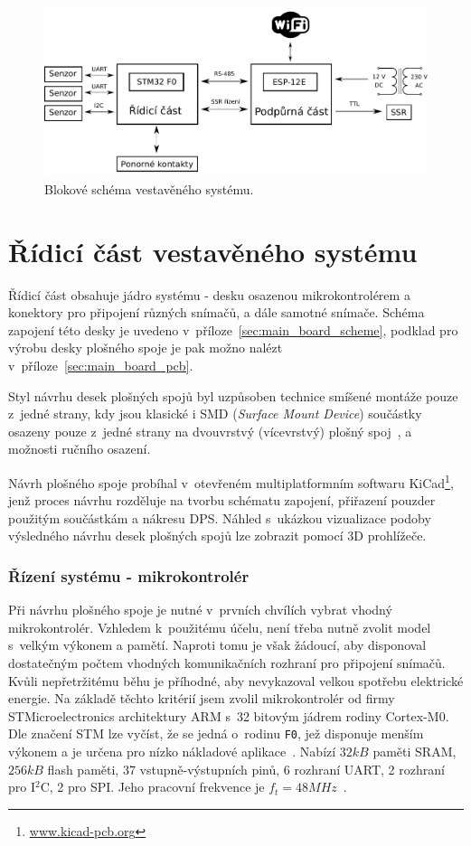         \begin{figure}[h]
            \centering
            \includegraphics[width=\linewidth]{obrazky-figures/scheme.pdf}
            \caption{Blokové schéma vestavěného systému.}
            \label{img:block_scheme}
        \end{figure}

    \section{Řídicí část vestavěného systému}
        Řídicí část obsahuje jádro systému - desku osazenou mikrokontrolérem a konektory pro připojení různých snímačů, a dále samotné snímače. Schéma zapojení této desky je uvedeno v~příloze~\ref{sec:main_board_scheme}, podklad pro výrobu desky plošného spoje je pak možno nalézt v~příloze~\ref{sec:main_board_pcb}. 

        Styl návrhu desek plošných spojů byl uzpůsoben technice smíšené montáže pouze z~jedné strany, kdy jsou klasické i SMD (\textit{Surface Mount Device}) součástky osazeny pouze z~jedné strany na dvouvrstvý (vícevrstvý) plošný spoj~\cite{book:dps}, a možnosti ručního osazení.

        Návrh plošného spoje probíhal v~otevřeném multiplatformním softwaru KiCad\footnote{\url{www.kicad-pcb.org}}, jenž proces návrhu rozděluje na tvorbu schématu zapojení, přiřazení pouzder použitým součástkám a nákresu DPS. Náhled s~ukázkou vizualizace podoby výsledného návrhu desek plošných spojů lze zobrazit pomocí 3D prohlížeče.

        \subsubsection{Řízení systému - mikrokontrolér}
            Při návrhu plošného spoje je nutné v~prvních chvílích vybrat vhodný mikrokontrolér. Vzhledem k~použitému účelu, není třeba nutně zvolit model s~velkým výkonem a pamětí. Naproti tomu je však žádoucí, aby disponoval dostatečným počtem vhodných komunikačních rozhraní pro připojení snímačů. Kvůli nepřetržitému běhu je příhodné, aby nevykazoval velkou spotřebu elektrické energie. Na základě těchto kritérií jsem zvolil mikrokontrolér  od firmy STMicroelectronics architektury ARM s~32 bitovým jádrem rodiny Cortex-M0. Dle značení STM lze vyčíst, že se jedná o~rodinu \texttt{F0}, jež disponuje menším výkonem a je určena pro nízko nákladové aplikace~\cite{stm:f0}. Nabízí $32\unit{kB}$ paměti SRAM, $256\unit{kB}$ flash paměti, 37 vstupně-výstupních pinů, 6 rozhraní UART, 2 rozhraní pro I$^2$C, 2 pro SPI. Jeho pracovní frekvence je $f_t=48\unit{MHz}$~\cite{stm:datasheet}.

